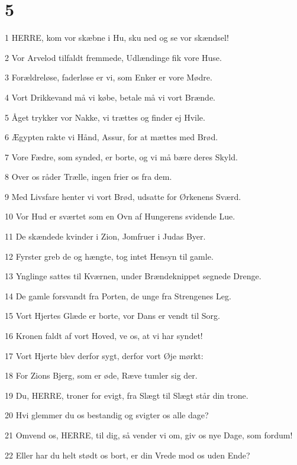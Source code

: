 \chapter{5}

\par 1 HERRE, kom vor skæbne i Hu, sku ned og se vor skændsel!
\par 2 Vor Arvelod tilfaldt fremmede, Udlændinge fik vore Huse.
\par 3 Forældreløse, faderløse er vi, som Enker er vore Mødre.
\par 4 Vort Drikkevand må vi købe, betale må vi vort Brænde.
\par 5 Åget trykker vor Nakke, vi trættes og finder ej Hvile.
\par 6 Ægypten rakte vi Hånd, Assur, for at mættes med Brød.
\par 7 Vore Fædre, som synded, er borte, og vi må bære deres Skyld.
\par 8 Over os råder Trælle, ingen frier os fra dem.
\par 9 Med Livsfare henter vi vort Brød, udsatte for Ørkenens Sværd.
\par 10 Vor Hud er sværtet som en Ovn af Hungerens svidende Lue.
\par 11 De skændede kvinder i Zion, Jomfruer i Judas Byer.
\par 12 Fyrster greb de og hængte, tog intet Hensyn til gamle.
\par 13 Ynglinge sattes til Kværnen, under Brændeknippet segnede Drenge.
\par 14 De gamle forsvandt fra Porten, de unge fra Strengenes Leg.
\par 15 Vort Hjertes Glæde er borte, vor Dans er vendt til Sorg.
\par 16 Kronen faldt af vort Hoved, ve os, at vi har syndet!
\par 17 Vort Hjerte blev derfor sygt, derfor vort Øje mørkt:
\par 18 For Zions Bjerg, som er øde, Ræve tumler sig der.
\par 19 Du, HERRE, troner for evigt, fra Slægt til Slægt står din trone.
\par 20 Hvi glemmer du os bestandig og svigter os alle dage?
\par 21 Omvend os, HERRE, til dig, så vender vi om, giv os nye Dage, som fordum!
\par 22 Eller har du helt stødt os bort, er din Vrede mod os uden Ende?


